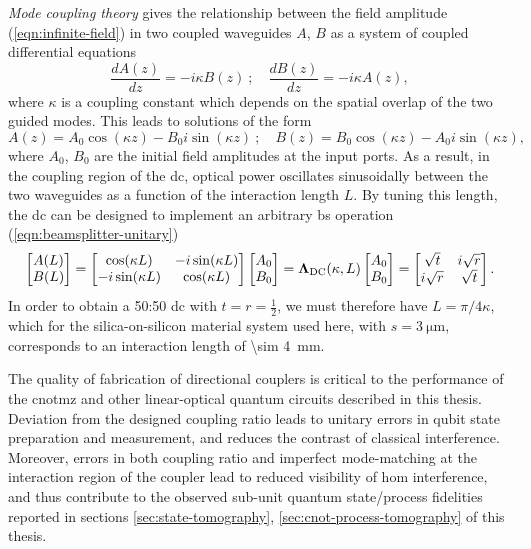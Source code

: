 \emph{Mode coupling theory} \cite{Lifante2003} gives the relationship between the field amplitude (\ref{eqn:infinite-field}) in two coupled waveguides $A$, $B$ as a system of coupled differential equations
\begin{equation}
   \frac{dA(z)}{dz}  = - i \kappa B(z) ~; \quad 
   \frac{dB(z)}{dz}  = - i \kappa A(z),
\end{equation}
where $\kappa$ is a coupling constant which depends on the spatial overlap of the two guided modes. This leads to solutions of the form
\begin{equation}
    A(z) = A_0 \cos(\kappa z) - B_0 i \sin(\kappa z)~;\quad
    B(z) = B_0 \cos(\kappa z) - A_0 i \sin(\kappa z),
\end{equation}
where $A_0$, $B_0$ are the initial field amplitudes at the input ports. As a result, in the coupling region of the \gls{dc}, optical power oscillates sinusoidally between the two waveguides as a function of the interaction length $L$. By tuning this length, the \gls{dc} can be designed to implement an arbitrary \gls{bs} operation (\ref{eqn:beamsplitter-unitary})
\begin{equation}
\begin{bmatrix} A(L)\\ B(L)\end{bmatrix} 
=
\begin{bmatrix} 
 \cos(\kappa L)  & -i \sin (\kappa L)\\
-i \sin(\kappa L) & \cos (\kappa L)
\end{bmatrix} 
\begin{bmatrix} A_0\\ B_0\end{bmatrix} 
=
\mathbf{\Lambda}_\text{DC} (\kappa, L) 
\begin{bmatrix} A_0\\ B_0\end{bmatrix} 
=
\begin{bmatrix} 
\sqrt{t}  & i \sqrt{r}\\
i \sqrt{r}  & \sqrt{t}
\end{bmatrix} .
\end{equation}
In order to obtain a 50:50 \gls{dc} with $t=r=\frac{1}{2}$, we must therefore have $L=\pi/4 \kappa$, which for the silica-on-silicon material system used here, with $s=\SI{3}{\micro\metre}$, corresponds to an interaction length of \SI{\sim 4}{\milli \metre}.

The quality of fabrication of directional couplers is critical to the performance of the \gls{cnotmz} and other linear-optical quantum circuits described in this thesis. Deviation from the designed coupling ratio leads to unitary errors in qubit state preparation and measurement, and reduces the contrast of classical interference. Moreover, errors in both coupling ratio and imperfect mode-matching at the interaction region of the coupler lead to reduced visibility of \gls{hom} interference, and thus contribute to the observed sub-unit quantum state/process fidelities reported in sections \ref{sec:state-tomography}, \ref{sec:cnot-process-tomography} of this thesis.

